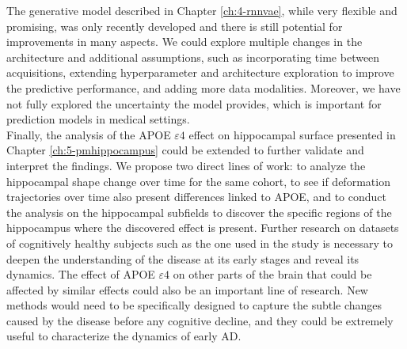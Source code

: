 The generative model described in Chapter \ref{ch:4-rnnvae}, while very flexible and promising, was only recently developed and there is still potential for improvements in many aspects. We could explore multiple changes in the architecture and additional assumptions, such as incorporating time between acquisitions, extending hyperparameter and architecture exploration to improve the predictive performance, and adding more data modalities. Moreover, we have not fully explored the uncertainty the model provides, which is important for prediction models in medical settings. \\

Finally, the analysis of the APOE $\varepsilon4$ effect on hippocampal surface presented in Chapter \ref{ch:5-pmhippocampus} could be extended to further validate and interpret the findings. We propose two direct lines of work: to analyze the hippocampal shape change over time for the same cohort, to see if deformation trajectories over time also present differences linked to APOE, and to conduct the analysis on the hippocampal subfields to discover the specific regions of the hippocampus where the discovered effect is present. Further research on datasets of cognitively healthy subjects such as the one used in the study is necessary to deepen the understanding of the disease at its early stages and reveal its dynamics. The effect of APOE $\varepsilon4$ on other parts of the brain that could be affected by similar effects could also be an important line of research. New methods would need to be specifically designed to capture the subtle changes caused by the disease before any cognitive decline, and they could be extremely useful to characterize the dynamics of early AD.
